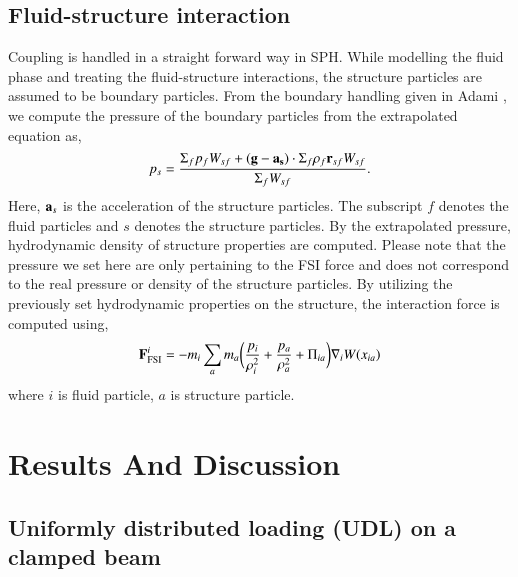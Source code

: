 \subsection{Fluid-structure interaction}\label{subsec:fsi}
Coupling is handled in a straight forward way in SPH. While modelling the fluid
phase and treating the fluid-structure interactions, the structure particles are
assumed to be boundary particles. From the boundary handling given in Adami
\citep{Adami2012}, we compute the pressure of the boundary particles from
the extrapolated equation as,
\begin{equation}
  \label{eq:pressure-bc}
  p_s = \frac{\Sigma_f p_f W_{sf} + (\mathbf{g} - \mathbf{a}_{\mathbf{s}}) \cdot \Sigma_f
    \rho_f \mathbf{r}_{sf} W_{sf}}{\Sigma_f W_{sf}}.
\end{equation}
Here, $\mathbf{a}_s$ is the acceleration of the structure particles. The subscript
$f$ denotes the fluid particles and $s$ denotes the structure particles. By the
extrapolated pressure, hydrodynamic density of structure properties are
computed. Please note that the pressure we set here are only pertaining to the
FSI force and does not correspond to the real pressure or density of the
structure particles. By utilizing the previously set hydrodynamic properties on
the structure, the interaction force is computed using,
\begin{equation}
  \mathbf{F}_{\text{FSI}}^i = -m_i \sum_{a} m_a \bigg(\frac{p_i}{\rho_{i}^2} +
  \frac{p_a}{\rho_{a}^2} + \Pi_{ia} \bigg) \nabla_{i} W(x_{ia})
\end{equation}
where $i$ is fluid particle, $a$ is structure particle.


\section{Results And Discussion}\label{sec3}

\subsection{Uniformly distributed loading (UDL) on a clamped beam}
\label{sec:udl}


